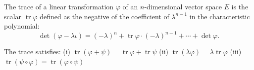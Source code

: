 The trace of a linear transformation $\varphi$ of an $n$-dimensional vector space $E$ is the scalar $\operatorname{tr} \varphi$ defined as the negative of the coefficient of $\lambda^{n-1}$ in the characteristic polynomial:
$$\det(\varphi - \lambda\iota) = (-\lambda)^n + \operatorname{tr} \varphi \cdot (-\lambda)^{n-1} + \cdots + \det \varphi.$$

The trace satisfies:
(i) $\operatorname{tr}(\varphi + \psi) = \operatorname{tr} \varphi + \operatorname{tr} \psi$
(ii) $\operatorname{tr}(\lambda \varphi) = \lambda \operatorname{tr} \varphi$
(iii) $\operatorname{tr}(\psi \circ \varphi) = \operatorname{tr}(\varphi \circ \psi)$
